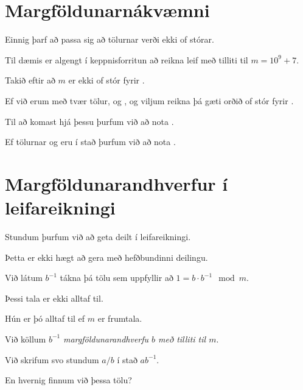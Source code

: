 \section{Margföldunarnákvæmni}
{
    {
        \item<1-> Einnig þarf að passa sig að tölurnar verði ekki of stórar.
        \item<2-> Til dæmis er algengt í keppnisforritun að reikna leif með tilliti til $m = 10^9 + 7$.
        \item<3-> Takið eftir að $m$ er ekki of stór fyrir .
        \item<4-> Ef við erum með tvær  tölur,  og , og viljum reikna 
                    þá gæti  orðið of stór fyrir .
        \item<5-> Til að komast hjá þessu þurfum við að nota .
        \item<6-> Ef tölurnar  og  eru  í stað  þurfum við að nota .
        \item<7->[] 
    }
}

\section{Margföldunarandhverfur í leifareikningi}
{
    {
        \item<1-> Stundum þurfum við að geta deilt í leifareikningi.
        \item<2-> Þetta er ekki hægt að gera með hefðbundinni deilingu.
        \item<3-> Við látum $b^{-1}$ tákna þá tölu sem uppfyllir að $1 = b \cdot b^{-1} \mod m$.
        \item<4-> Þessi tala er ekki alltaf til.
        \item<5-> Hún er þó alltaf til ef $m$ er frumtala.
        \item<6-> Við köllum $b^{-1}$ \emph{margföldunarandhverfu $b$ með tilliti til $m$}.
        \item<7-> Við skrifum svo stundum $a/b$ í stað $ab^{-1}$.
        \item<8-> En hvernig finnum við þessa tölu?
    }
}

